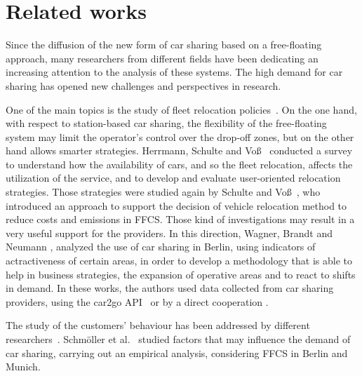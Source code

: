 \section{Related works}
\label{sec:3_2_related}
Since the diffusion of the new form of car sharing based on a free-floating approach, many researchers from different fields have been dedicating an increasing attention to the analysis of these systems.
The high demand for car sharing has opened new challenges and perspectives in research.

One of the main topics is the study of fleet relocation policies~\cite{Herrmann2014,Schulte2015,Wagner2015}. On the one hand, with respect to station-based car sharing, the flexibility of the free-floating system may limit the operator's control over the drop-off zones, but on the other hand allows smarter strategies. 
Herrmann, Schulte and Voß~\cite{Herrmann2014} conducted a survey to understand how the availability of cars, and so the fleet relocation, affects the utilization of the service, and to develop and evaluate user-oriented relocation strategies.
Those strategies were studied again by Schulte and Voß~\cite{Schulte2015}, who introduced an approach to support the decision of vehicle relocation method to reduce costs and emissions in FFCS.
Those kind of investigations may result in a very useful support for the providers. In this direction, Wagner, Brandt and Neumann \cite{Wagner2015}, analyzed the use of car sharing in Berlin, using indicators of actractiveness of certain areas, in order to develop a methodology that is able to help in business strategies, the expansion of operative areas and to react to shifts in demand. In these works, the authors used data collected from car sharing providers, using the car2go API~\cite{Herrmann2014,Schulte2015} or by a direct cooperation \cite{Wagner2015}.

The study of the customers' behaviour has been addressed by different researchers~\cite{Schmoller2015,Kopp2015,Firnkorn2012,Ciari2013,Tyndall2016}. 
Schmöller et al.~\cite{Schmoller2015} studied factors that may influence the demand of car sharing, carrying out an empirical analysis, considering FFCS in Berlin and Munich.

